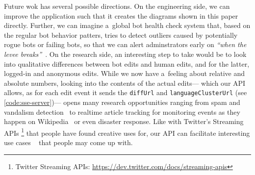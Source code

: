 \documentclass{sig-alternate}
\newcommand{\inlinelistingsize}{\fontsize{8pt}{11pt}}
\let\oldurl\url
\renewcommand{\url}[1]{\inlinelistingsize\oldurl{#1}}
\begin{document}
Future wok has several possible directions.
On the engineering side, we can improve the application
such that it creates the diagrams shown in this paper directly.
Further, we can imagine a~global bot health check system
that, based on the regular bot behavior patters,
tries to detect outliers caused by
potentially rogue bots or failing bots,
so that we can alert adminstrators early on
\textit{``when the levee breaks''}~\cite{geiger2013withoutbots}.
On the research side, an interesting step to take
would be to look into qualitative differences
between bot edits and human edits, and for the latter,
logged-in and anonymous edits.
While we now have a~feeling about relative and absolute numbers,
looking into the contents of the actual edits---%
which our API allows, as for each edit event it sends the
\texttt{diffUrl} and \texttt{languageClusterUrl}
(see \autoref{code:sse-server})---%
opens many research opportunities ranging from spam
and vandalism detection~\cite{alfonseca2013spam}
to realtime article tracking for monitoring events
as they happen on Wikipedia~\cite{steiner2013mjnomore}
or even disaster response.
Like with Twitter's Streaming APIs%
\footnote{Twitter Streaming APIs:
\url{https://dev.twitter.com/docs/streaming-apis}}
that people have found creative uses for,
our API can facilitate interesting use cases%
~\cite{mestyan2013boxoffice,yasseri2012conflicts}
that people may come up with.
 


\balancecolumns
\end{document}
